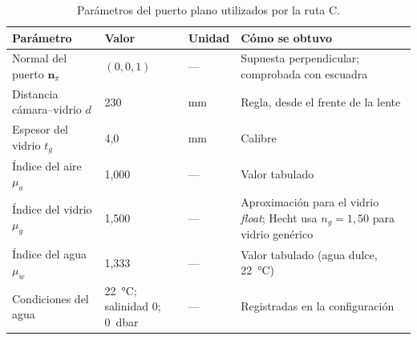 
\begin{table}[htbp]
\centering\footnotesize
\caption{Parámetros del puerto plano utilizados por la ruta C.}
\label{tab:puerto}
\begin{tabular}{@{}p{3.6cm}p{2.6cm}p{1.2cm}p{5.4cm}@{}}
\toprule
Parámetro & Valor & Unidad & Cómo se obtuvo \\
\midrule
Normal del puerto $\mathbf{n}_\pi$ & $(0, 0, 1)$ & --- & Supuesta perpendicular; comprobada con escuadra \\
Distancia cámara--vidrio $d$ & 230 & mm & Regla, desde el frente de la lente \\
Espesor del vidrio $t_g$ & 4,0 & mm & Calibre \\
Índice del aire $\mu_a$ & 1,000 & --- & Valor tabulado \\
Índice del vidrio $\mu_g$ & 1,500 & --- & Aproximación para el vidrio \emph{float}; Hecht usa $n_g = 1{,}50$ para vidrio genérico \parencite[pp.~111, 132]{Hecht2017} \\
Índice del agua $\mu_w$ & 1,333 & --- & Valor tabulado (agua dulce, 22~\si{\celsius}) \\
Condiciones del agua & 22~\si{\celsius}; salinidad 0; 0~dbar & --- & Registradas en la configuración \\
\bottomrule
\end{tabular}
\end{table}
